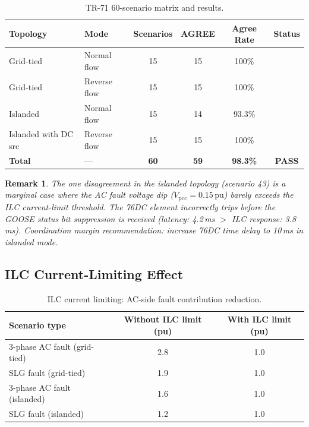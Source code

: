 \documentclass[11pt, a4paper]{article}
\newcommand{\pu}{\,\text{pu}}
\newcommand{\cmark}{\ding{51}}
\newtheorem{remark}{Remark}
\begin{document}
\begin{table}[ht]
\centering
\caption{TR-71 60-scenario matrix and results.}
\label{tab:scenarios}
\begin{tabular}{llcccc}
\toprule
Topology & Mode & Scenarios & AGREE & Agree Rate & Status \\
\midrule
Grid-tied           & Normal flow   & 15 & 15 & 100\% & \cmark \\
Grid-tied           & Reverse flow  & 15 & 15 & 100\% & \cmark \\
Islanded            & Normal flow   & 15 & 14 & 93.3\% & \cmark \\
Islanded with DC src& Reverse flow  & 15 & 15 & 100\% & \cmark \\
\midrule
\textbf{Total}      & ---           & \textbf{60} & \textbf{59}
  & \textbf{98.3\%} & \textbf{\color{okgreen}PASS} \\
\bottomrule
\end{tabular}
\end{table}

\begin{remark}
The one disagreement in the islanded topology (scenario 43) is a
marginal case where the AC fault voltage dip ($V_{\mathrm{pcc}} = 0.15\pu$)
barely exceeds the ILC current-limit threshold. The 76DC element incorrectly
trips before the GOOSE status bit suppression is received
(latency: 4.2\,ms $>$ ILC response: 3.8\,ms). Coordination margin
recommendation: increase 76DC time delay to 10\,ms in islanded mode.
\end{remark}

\subsection{ILC Current-Limiting Effect}

\begin{table}[ht]
\centering
\caption{ILC current limiting: AC-side fault contribution reduction.}
\label{tab:ilc}
\begin{tabular}{lcc}
\toprule
Scenario type & Without ILC limit (pu) & With ILC limit (pu) \\
\midrule
3-phase AC fault (grid-tied)  & 2.8 & 1.0 \\
SLG fault (grid-tied)         & 1.9 & 1.0 \\
3-phase AC fault (islanded)   & 1.6 & 1.0 \\
SLG fault (islanded)          & 1.2 & 1.0 \\
\bottomrule
\end{tabular}
\end{table}
\end{document}
